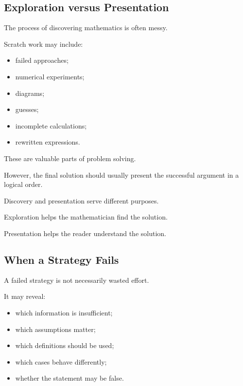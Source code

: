 \subsection{Exploration versus Presentation}
\label{subsec:exploration-vs-presentation}

The process of discovering mathematics is often messy.

Scratch work may include:

\begin{itemize}
    \item failed approaches;
    \item numerical experiments;
    \item diagrams;
    \item guesses;
    \item incomplete calculations;
    \item rewritten expressions.
\end{itemize}

These are valuable parts of problem solving.

However, the final solution should usually present the successful argument in
a logical order.

\begin{conceptbox}
Discovery and presentation serve different purposes.

Exploration helps the mathematician find the solution.

Presentation helps the reader understand the solution.
\end{conceptbox}

\subsection{When a Strategy Fails}
\label{subsec:when-strategy-fails}

A failed strategy is not necessarily wasted effort.

It may reveal:

\begin{itemize}
    \item which information is insufficient;
    \item which assumptions matter;
    \item which definitions should be used;
    \item which cases behave differently;
    \item whether the statement may be false.
\end{itemize}

